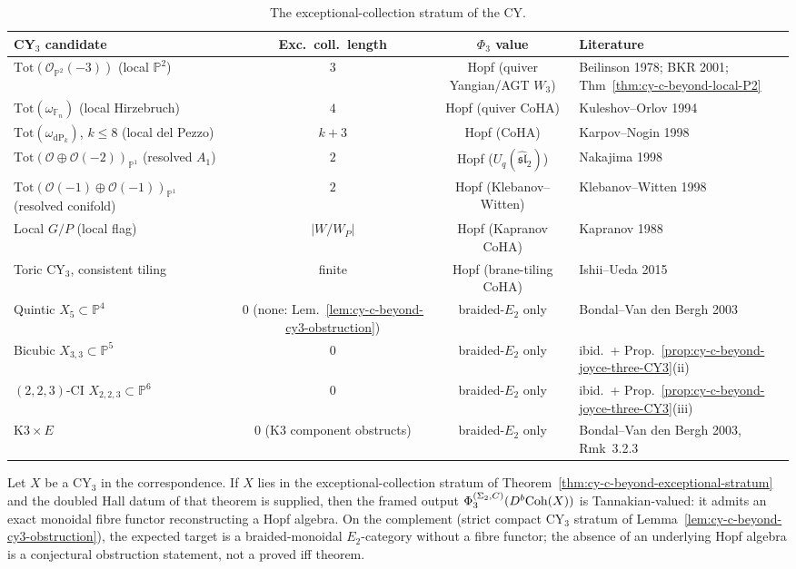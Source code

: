 \begin{table}[ht]
\centering
\renewcommand{\arraystretch}{1.15}
\caption{The exceptional-collection stratum of the CY.}
\label{tab:cy-c-beyond-exceptional-stratum}
\begin{tabular}{lccl}
\toprule
CY$_3$ candidate & Exc.\ coll.\ length & $\Phi_3$ value & Literature \\
\midrule
$\mathrm{Tot}(\mathcal O_{\mathbb P^2}(-3))$ (local $\mathbb P^2$)
 & $3$ & Hopf (quiver Yangian/AGT $W_3$) & Beilinson 1978; BKR 2001; Thm~\ref{thm:cy-c-beyond-local-P2} \\
$\mathrm{Tot}(\omega_{\mathbb F_n})$ (local Hirzebruch)
 & $4$ & Hopf (quiver CoHA) & Kuleshov--Orlov 1994 \\
$\mathrm{Tot}(\omega_{\mathrm{dP}_k})$, $k \leq 8$ (local del Pezzo)
 & $k+3$ & Hopf (CoHA) & Karpov--Nogin 1998 \\
$\mathrm{Tot}(\mathcal O \oplus \mathcal O(-2))_{\mathbb P^1}$ (resolved $A_1$)
 & $2$ & Hopf ($U_q(\widehat{\mathfrak{sl}}_2)$) & Nakajima 1998 \\
$\mathrm{Tot}(\mathcal O(-1) \oplus \mathcal O(-1))_{\mathbb P^1}$ (resolved conifold)
 & $2$ & Hopf (Klebanov--Witten) & Klebanov--Witten 1998 \\
Local $G/P$ (local flag)
 & $|W/W_P|$ & Hopf (Kapranov CoHA) & Kapranov 1988 \\
Toric CY$_3$, consistent tiling
 & finite & Hopf (brane-tiling CoHA) & Ishii--Ueda 2015 \\
\midrule
Quintic $X_5 \subset \mathbb P^4$
 & $0$ (none: Lem.~\ref{lem:cy-c-beyond-cy3-obstruction})
 & braided-$E_2$ only & Bondal--Van den Bergh 2003 \\
Bicubic $X_{3,3} \subset \mathbb P^5$
 & $0$ & braided-$E_2$ only & ibid.\ + Prop.~\ref{prop:cy-c-beyond-joyce-three-CY3}(ii) \\
$(2,2,3)$-CI $X_{2,2,3} \subset \mathbb P^6$
 & $0$ & braided-$E_2$ only & ibid.\ + Prop.~\ref{prop:cy-c-beyond-joyce-three-CY3}(iii) \\
$\mathrm{K3} \times E$
 & $0$ (K3 component obstructs)
 & braided-$E_2$ only & Bondal--Van den Bergh 2003, Rmk~3.2.3 \\
\bottomrule
\end{tabular}
\end{table}

\begin{corollary}
\label{cor:cy-c-beyond-phi3-tannakian-threshold}
Let $X$ be a CY$_3$ in the correspondence. If $X$ lies in the
exceptional-collection stratum of
Theorem~\ref{thm:cy-c-beyond-exceptional-stratum} and the doubled Hall
datum of that theorem is supplied, then the framed output
$\Phi_3^{(\Sigma_2,C)}(D^b\mathrm{Coh}(X))$ is Tannakian-valued: it admits an
exact monoidal fibre functor reconstructing a Hopf algebra. On the complement
(strict compact CY$_3$ stratum of
Lemma~\ref{lem:cy-c-beyond-cy3-obstruction}), the expected target is a
braided-monoidal $E_2$-category without a fibre functor; the absence of
an underlying Hopf algebra is a conjectural obstruction statement, not a
proved iff theorem.
\end{corollary}

